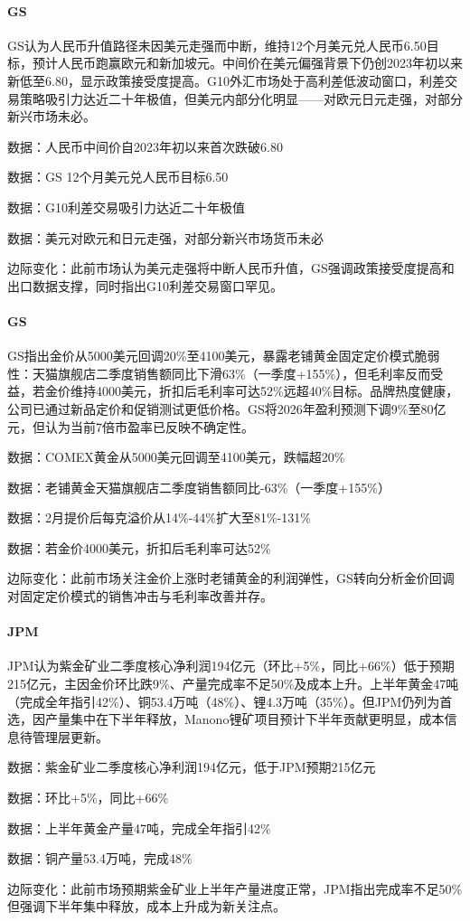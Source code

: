 \documentclass[11pt]{ctexart}
\begin{document}
\paragraph{GS} GS认为人民币升值路径未因美元走强而中断，维持12个月美元兑人民币6.50目标，预计人民币跑赢欧元和新加坡元。中间价在美元偏强背景下仍创2023年初以来新低至6.80，显示政策接受度提高。G10外汇市场处于高利差低波动窗口，利差交易策略吸引力达近二十年极值，但美元内部分化明显——对欧元日元走强，对部分新兴市场未必。
{\small\color{refgray}数据：人民币中间价自2023年初以来首次跌破6.80\par}
{\small\color{refgray}数据：GS 12个月美元兑人民币目标6.50\par}
{\small\color{refgray}数据：G10利差交易吸引力达近二十年极值\par}
{\small\color{refgray}数据：美元对欧元和日元走强，对部分新兴市场货币未必\par}
{\small\color{refgray}边际变化：此前市场认为美元走强将中断人民币升值，GS强调政策接受度提高和出口数据支撑，同时指出G10利差交易窗口罕见。\par}
\paragraph{GS} GS指出金价从5000美元回调20\%至4100美元，暴露老铺黄金固定定价模式脆弱性：天猫旗舰店二季度销售额同比下滑63\%（一季度+155\%），但毛利率反而受益，若金价维持4000美元，折扣后毛利率可达52\%远超40\%目标。品牌热度健康，公司已通过新品定价和促销测试更低价格。GS将2026年盈利预测下调9\%至80亿元，但认为当前7倍市盈率已反映不确定性。
{\small\color{refgray}数据：COMEX黄金从5000美元回调至4100美元，跌幅超20\%\par}
{\small\color{refgray}数据：老铺黄金天猫旗舰店二季度销售额同比-63\%（一季度+155\%）\par}
{\small\color{refgray}数据：2月提价后每克溢价从14\%-44\%扩大至81\%-131\%\par}
{\small\color{refgray}数据：若金价4000美元，折扣后毛利率可达52\%\par}
{\small\color{refgray}边际变化：此前市场关注金价上涨时老铺黄金的利润弹性，GS转向分析金价回调对固定定价模式的销售冲击与毛利率改善并存。\par}
\paragraph{JPM} JPM认为紫金矿业二季度核心净利润194亿元（环比+5\%，同比+66\%）低于预期215亿元，主因金价环比跌9\%、产量完成率不足50\%及成本上升。上半年黄金47吨（完成全年指引42\%）、铜53.4万吨（48\%）、锂4.3万吨（35\%）。但JPM仍列为首选，因产量集中在下半年释放，Manono锂矿项目预计下半年贡献更明显，成本信息待管理层更新。
{\small\color{refgray}数据：紫金矿业二季度核心净利润194亿元，低于JPM预期215亿元\par}
{\small\color{refgray}数据：环比+5\%，同比+66\%\par}
{\small\color{refgray}数据：上半年黄金产量47吨，完成全年指引42\%\par}
{\small\color{refgray}数据：铜产量53.4万吨，完成48\%\par}
{\small\color{refgray}边际变化：此前市场预期紫金矿业上半年产量进度正常，JPM指出完成率不足50\%但强调下半年集中释放，成本上升成为新关注点。\par}
\end{document}
